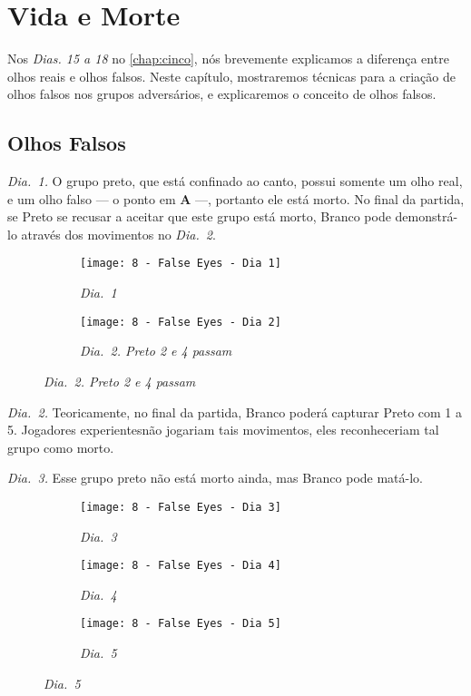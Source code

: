 \chapter{Vida e Morte}

Nos \emph{Dias. 15 a 18} no \autoref{chap:cinco}, nós brevemente explicamos a diferença entre olhos reais e olhos falsos. Neste capítulo, mostraremos técnicas para a criação de olhos falsos nos grupos adversários, e explicaremos o conceito de olhos falsos.

\section{Olhos Falsos}

\emph{Dia.\@~1.} O grupo preto, que está confinado ao canto, possui somente um olho real, e um olho falso --- o ponto em \textbf{A} ---, portanto ele está morto. No final da partida, se Preto se recusar a aceitar que este grupo está morto, Branco pode demonstrá-lo através dos movimentos no \emph{Dia.\@~2}.

\begin{figure}[h!]
    \centering
    \begin{subfigure}[t]{.31\textwidth}
        \texttt{[image: 8 - False Eyes - Dia 1]}
        \caption*{\emph{Dia.\@~1}}
    \end{subfigure}
    \hspace{1cm}
    \begin{subfigure}[t]{.31\textwidth}
        \texttt{[image: 8 - False Eyes - Dia 2]}
        \caption*{\emph{Dia.\@~2. Preto 2 e 4 passam}}
    \end{subfigure}
\end{figure}

\emph{Dia.\@~2.} Teoricamente, no final da partida, Branco poderá capturar Preto com 1 a 5. Jogadores experientesnão jogariam tais movimentos, eles reconheceriam tal grupo como morto.

\pagebreak

\emph{Dia.\@~3.} Esse grupo preto não está morto ainda, mas Branco pode matá-lo.

\begin{figure}[h!]
    \centering
    \begin{subfigure}[t]{.31\textwidth}
        \texttt{[image: 8 - False Eyes - Dia 3]}
        \caption*{\emph{Dia.\@~3}}
    \end{subfigure}
    \hfill
    \begin{subfigure}[t]{.31\textwidth}
        \texttt{[image: 8 - False Eyes - Dia 4]}
        \caption*{\emph{Dia.\@~4}}
    \end{subfigure}
    \hfill
    \begin{subfigure}[t]{.31\textwidth}
        \texttt{[image: 8 - False Eyes - Dia 5]}
        \caption*{\emph{Dia.\@~5}}
    \end{subfigure}
\end{figure}

